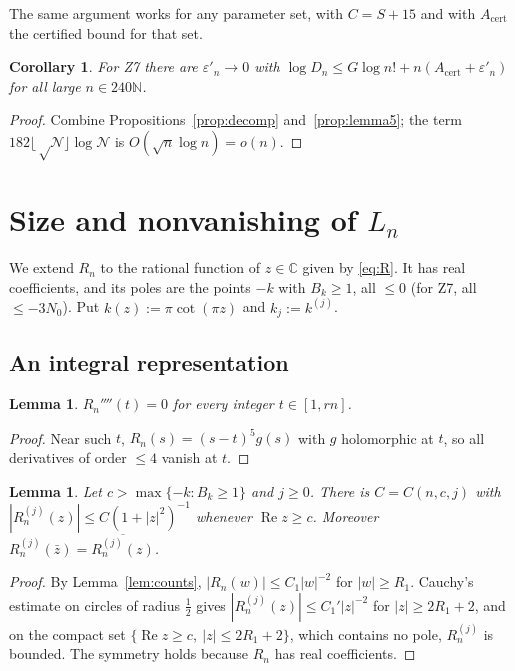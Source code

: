\documentclass[11pt]{amsart}
\newtheorem{lemma}[theorem]{Lemma}
\newtheorem{corollary}[theorem]{Corollary}
\theoremstyle{definition}
\theoremstyle{remark}
\numberwithin{equation}{section}
\newcommand{\NN}{\mathbb{N}}
\newcommand{\CC}{\mathbb{C}}
\newcommand{\cN}{\mathcal{N}}
\newcommand{\Acert}{A_{\mathrm{cert}}}
\renewcommand{\Re}{\operatorname{Re}}
\newcommand{\eps}{\varepsilon}
\begin{document}
The same argument works for any parameter set, with $C=S+15$ and with $\Acert$ the certified bound for that set.

\begin{corollary}\label{cor:logD}
For Z7 there are $\eps'_n\to0$ with $\log D_n\le G\log n!+n(\Acert+\eps'_n)$ for all large $n\in240\NN$.
\end{corollary}

\begin{proof}
Combine Propositions~\ref{prop:decomp} and~\ref{prop:lemma5}; the term $182\lfloor\sqrt\cN\rfloor\log\cN$ is
$O(\sqrt n\log n)=o(n)$.
\end{proof}

\section{\texorpdfstring{Size and nonvanishing of $L_n$}{Size and nonvanishing of L\_n}}\label{sec:nonvan}

We extend $R_n$ to the rational function of $z\in\CC$ given by \eqref{eq:R}. It has real coefficients, and its
poles are the points $-k$ with $B_k\ge1$, all $\le0$ (for Z7, all $\le-3N_0$). Put $k(z):=\pi\cot(\pi z)$ and
$k_j:=k^{(j)}$.

\subsection{An integral representation}

\begin{lemma}\label{lem:vanish}
$R_n''''(t)=0$ for every integer $t\in[1,rn]$.
\end{lemma}

\begin{proof}
Near such $t$, $R_n(s)=(s-t)^5g(s)$ with $g$ holomorphic at $t$, so all derivatives of order $\le4$ vanish at $t$.
\end{proof}

\begin{lemma}\label{lem:decay}
Let $c>\max\{-k:B_k\ge1\}$ and $j\ge0$. There is $C=C(n,c,j)$ with $|R_n^{(j)}(z)|\le C(1+|z|^2)^{-1}$ whenever
$\Re z\ge c$. Moreover $R_n^{(j)}(\bar z)=\overline{R_n^{(j)}(z)}$.
\end{lemma}

\begin{proof}
By Lemma~\ref{lem:counts}, $|R_n(w)|\le C_1|w|^{-2}$ for $|w|\ge R_1$. Cauchy's estimate on circles of radius
$\frac12$ gives $|R_n^{(j)}(z)|\le C_1'|z|^{-2}$ for $|z|\ge2R_1+2$, and on the compact set
$\{\Re z\ge c,\ |z|\le2R_1+2\}$, which contains no pole, $R_n^{(j)}$ is bounded. The symmetry holds because $R_n$ has
real coefficients.
\end{proof}
\end{document}
